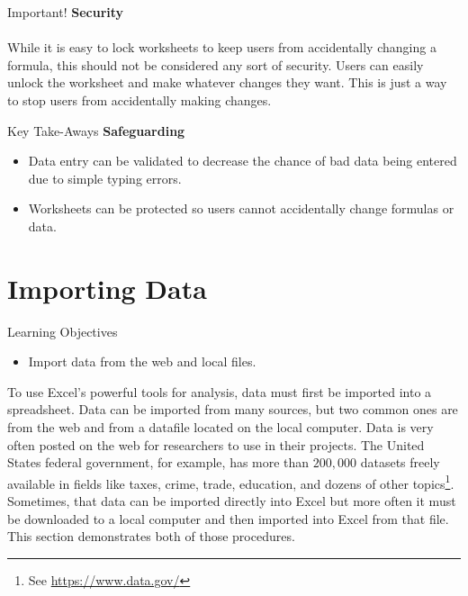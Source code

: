 \begin{center}
	\begin{infobox}{Important!}
		\textbf{Security}
		\\
		\\
		While it is easy to lock worksheets to keep users from accidentally changing a formula, this should not be considered any sort of security. Users can easily unlock the worksheet and make whatever changes they want. This is just a way to stop users from accidentally making changes.
	\end{infobox}
\end{center}

\begin{center}
	\begin{tkwbox}{Key Take-Aways}
		\textbf{Safeguarding}
		\\
		\begin{itemize}
			\setlength{\itemsep}{0pt}
			\setlength{\parskip}{0pt}
			\setlength{\parsep}{0pt}
			
			\item Data entry can be validated to decrease the chance of bad data being entered due to simple typing errors.
			\item Worksheets can be protected so users cannot accidentally change formulas or data.
			
		\end{itemize}
	\end{tkwbox}
\end{center}

\section{Importing Data}

\begin{center}
	\begin{objbox}{Learning Objectives}
		\begin{itemize}
			\setlength{\itemsep}{0pt}
			\setlength{\parskip}{0pt}
			\setlength{\parsep}{0pt}
			
			\item Import data from the web and local files.

		\end{itemize}
	\end{objbox}
\end{center}

To use Excel's powerful tools for analysis, data must first be imported into a spreadsheet. Data can be imported from many sources, but two common ones are from the web and from a datafile located on the local computer. Data is very often posted on the web for researchers to use in their projects. The United States federal government, for example, has more than $ 200,000 $ datasets freely available in fields like taxes, crime, trade, education, and dozens of other topics\footnote{See \url{https://www.data.gov/}}. Sometimes, that data can be imported directly into Excel but more often it must be downloaded to a local computer and then imported into Excel from that file. This section demonstrates both of those procedures.

